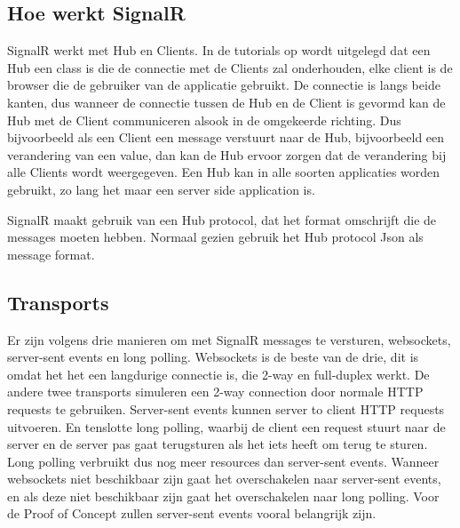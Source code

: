 \subsection{Hoe werkt SignalR}
SignalR werkt met Hub en Clients. In de tutorials op \textcite{PluralsightSignalR} wordt uitgelegd dat een Hub een class is die de connectie met de Clients zal onderhouden, elke client is de browser die de gebruiker van de applicatie gebruikt. De connectie is langs beide kanten, dus wanneer de connectie tussen de Hub en de Client is gevormd kan de Hub met de Client communiceren alsook in de omgekeerde richting. Dus bijvoorbeeld als een Client een message verstuurt naar de Hub, bijvoorbeeld een verandering van een value, dan kan de Hub ervoor zorgen dat de verandering bij alle Clients wordt weergegeven. Een Hub kan in alle soorten applicaties worden gebruikt, zo lang het maar een server side application is. 

SignalR maakt gebruik van een Hub protocol, dat het format omschrijft die de messages moeten hebben. Normaal gezien gebruik het Hub protocol Json als message format.

\subsection{Transports}
Er zijn volgens \textcite{PluralsightSignalR} drie manieren om met SignalR messages te versturen, websockets, server-sent events en long polling. Websockets is de beste van de drie, dit is omdat het het een langdurige connectie is, die 2-way en full-duplex werkt. De andere twee transports simuleren een 2-way connection door normale HTTP requests te gebruiken. Server-sent events kunnen server to client HTTP requests uitvoeren. En tenslotte long polling, waarbij de client een request stuurt naar de server en de server pas gaat terugsturen als het iets heeft om terug te sturen. Long polling verbruikt dus nog meer resources dan server-sent events. Wanneer websockets niet beschikbaar zijn gaat het overschakelen naar server-sent events, en als deze niet beschikbaar zijn gaat het overschakelen naar long polling.
Voor de Proof of Concept zullen server-sent events vooral belangrijk zijn. 